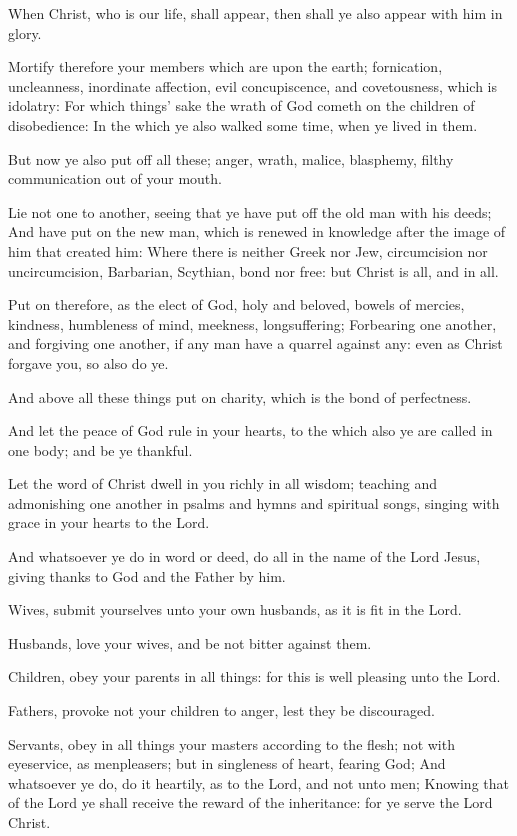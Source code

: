 \verse When Christ, who is our life, shall appear, then shall ye also appear with him in glory.

\verse Mortify therefore your members which are upon the earth; fornication, uncleanness, inordinate affection, evil concupiscence, and covetousness, which is idolatry: \verse For which things' sake the wrath of God cometh on the children of disobedience: \verse In the which ye also walked some time, when ye lived in them.

\verse But now ye also put off all these; anger, wrath, malice, blasphemy, filthy communication out of your mouth.

\verse Lie not one to another, seeing that ye have put off the old man with his deeds; \verse And have put on the new man, which is renewed in knowledge after the image of him that created him: \verse Where there is neither Greek nor Jew, circumcision nor uncircumcision, Barbarian, Scythian, bond nor free: but Christ is all, and in all.

\verse Put on therefore, as the elect of God, holy and beloved, bowels of mercies, kindness, humbleness of mind, meekness, longsuffering; \verse Forbearing one another, and forgiving one another, if any man have a quarrel against any: even as Christ forgave you, so also do ye.

\verse And above all these things put on charity, which is the bond of perfectness.

\verse And let the peace of God rule in your hearts, to the which also ye are called in one body; and be ye thankful.

\verse Let the word of Christ dwell in you richly in all wisdom; teaching and admonishing one another in psalms and hymns and spiritual songs, singing with grace in your hearts to the Lord.

\verse And whatsoever ye do in word or deed, do all in the name of the Lord Jesus, giving thanks to God and the Father by him.

\verse Wives, submit yourselves unto your own husbands, as it is fit in the Lord.

\verse Husbands, love your wives, and be not bitter against them.

\verse Children, obey your parents in all things: for this is well pleasing unto the Lord.

\verse Fathers, provoke not your children to anger, lest they be discouraged.

\verse Servants, obey in all things your masters according to the flesh; not with eyeservice, as menpleasers; but in singleness of heart, fearing God; \verse And whatsoever ye do, do it heartily, as to the Lord, and not unto men; \verse Knowing that of the Lord ye shall receive the reward of the inheritance: for ye serve the Lord Christ.

